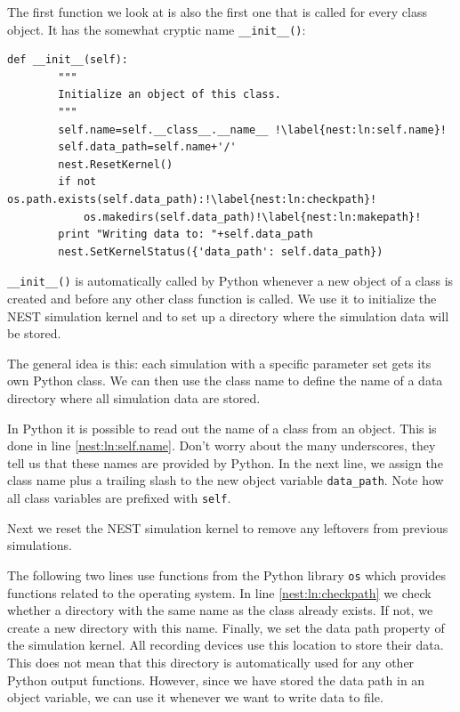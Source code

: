 \documentclass{article}
\begin{document}
The first function we look at is also the first one that is called for
every class object.  It has the somewhat cryptic name
\lstinline!__init__()!:
\begin{lstlisting}[name=brunel-classes]
    def __init__(self):
        """
        Initialize an object of this class.
        """
        self.name=self.__class__.__name__ !\label{nest:ln:self.name}!
        self.data_path=self.name+'/'
        nest.ResetKernel()
        if not os.path.exists(self.data_path):!\label{nest:ln:checkpath}!
            os.makedirs(self.data_path)!\label{nest:ln:makepath}!
        print "Writing data to: "+self.data_path
        nest.SetKernelStatus({'data_path': self.data_path})
\end{lstlisting}

\lstinline!__init__()! is automatically called by Python whenever a
new object of a class is created and before any other class function
is called. We use it to initialize the NEST simulation kernel and to
set up a directory where the simulation data will be stored.

The general idea is this: each simulation with a specific parameter
set gets its own Python class. We can then use the class name to
define the name of a data directory where all simulation data are
stored.

In Python it is possible to read out the name of a class from an
object. This is done in line \ref{nest:ln:self.name}. Don't worry
about the many underscores, they tell us that these names are provided
by Python. In the next line, we assign the class name plus a trailing
slash to the new object variable \lstinline!data_path!. Note how all
class variables are prefixed with \lstinline!self!. 

Next we reset the NEST simulation kernel to remove any leftovers from
previous simulations.

The following two lines use functions from the Python library
\lstinline!os! which provides functions related to the operating
system. In line \ref{nest:ln:checkpath} we check whether a directory
with the same name as the class already exists. If not, we create a
new directory with this name.  Finally, we set the data path property
of the simulation kernel. All recording devices use this location to
store their data. This does not mean that this directory is
automatically used for any other Python output functions. However,
since we have stored the data path in an object variable, we can use
it whenever we want to write data to file.
\end{document}
